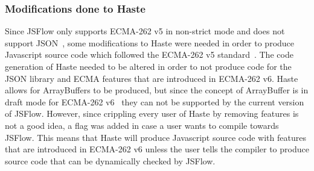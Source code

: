 \subsubsection{Modifications done to Haste}
Since JSFlow only supports ECMA-262 v5 in non-strict mode and does not support JSON~\cite{jsflow}, some modifications to Haste were needed in order to produce Javascript source code which followed the ECMA-262 v5 standard~\cite{ecma262v5}. The code generation of Haste needed to be altered in order to not produce code for the JSON library and ECMA features that are introduced in ECMA-262 v6. Haste allows for ArrayBuffers to be produced, but since the concept of ArrayBuffer is in draft mode for ECMA-262 v6~\cite{js_arraybuffer, ecma_arraybuffer} they can not be supported by the current version of JSFlow. However, since crippling every user of Haste by removing features is not a good idea, a flag was added in case a user wants to compile towards JSFlow. This means that Haste will produce Javascript source code with features that are introduced in ECMA-262 v6 unless the user tells the compiler to produce source code that can be dynamically checked by JSFlow.
